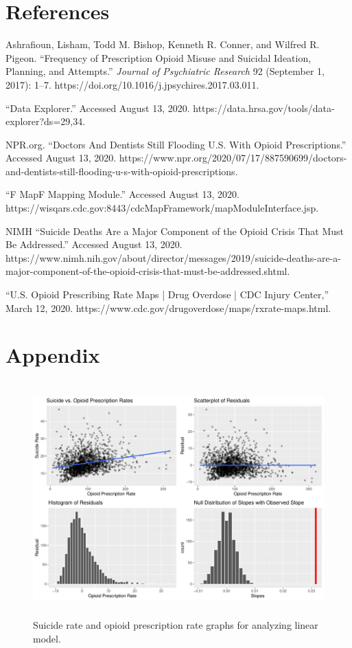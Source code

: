 \documentclass{article}
\newcommand{\<}{\langle}
\renewcommand{\>}{\rangle}
\theoremstyle{definition}
\begin{document}
\section*{References}
    \begin{enumerate}[label={[\arabic*]}]
     \item Ashrafioun, Lisham, Todd M. Bishop, Kenneth R. Conner, and Wilfred R. Pigeon. ``Frequency of Prescription Opioid Misuse and Suicidal Ideation, Planning, and Attempts.” \textit{Journal of Psychiatric Research} 92 (September 1, 2017): 1–7. https://doi.org/10.1016/j.jpsychires.2017.03.011.
    \item ``Data Explorer.” Accessed August 13, 2020. https://data.hrsa.gov/tools/data-explorer?ds=29,34.
    \item NPR.org. ``Doctors And Dentists Still Flooding U.S. With Opioid Prescriptions.” Accessed August 13, 2020. https://www.npr.org/2020/07/17/887590699/doctors-and-dentists-still-flooding-u-s-with-opioid-prescriptions.
    \item ``F MapF Mapping Module.” Accessed August 13, 2020. https://wisqars.cdc.gov:8443/cdcMapFramework/mapModuleInterface.jsp.

    \item NIMH ``Suicide Deaths Are a Major Component of the Opioid Crisis That Must Be Addressed.” Accessed August 13, 2020. https://www.nimh.nih.gov/about/director/messages/2019/suicide-deaths-are-a-major-component-of-the-opioid-crisis-that-must-be-addressed.shtml.
    \item ``U.S. Opioid Prescribing Rate Maps | Drug Overdose | CDC Injury Center,” March 12, 2020. https://www.cdc.gov/drugoverdose/maps/rxrate-maps.html.

    \end{enumerate}

\newpage

\section*{Appendix}
\begin{figure}[H]
    \centering
    \includegraphics[height = 9cm]{SR_OPR.pdf}
    \caption{Suicide rate and opioid prescription rate graphs for analyzing linear model. 
}
    \label{fig:my_label}
\end{figure} 
\end{document}
